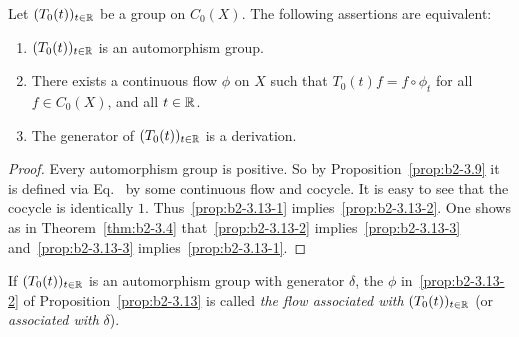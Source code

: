 \begin{proposition}\label{prop:b2-3.13}
Let $(T_{0}(t))_{t \in \mathbb{R}}$ be a group on $C_{0}(X)$.
The following assertions are equivalent:
\begin{enumerate}[\upshape (a)]
\item \label{prop:b2-3.13-1}
$(T_{0}(t))_{t \in \mathbb{R}}$ is an automorphism group.
\item \label{prop:b2-3.13-2}
There exists a continuous flow $\phi$ on $X$ such that $T_{0}(t)f = f \circ \phi_{t}$  for all \\
 $f \in C_{0}(X)$, and all $t \in \mathbb{R}$.
\item \label{prop:b2-3.13-3} 
The generator of\/ $(T_{0}(t))_{t \in \mathbb{R}}$ is a derivation.
\end{enumerate}
\end{proposition}
\begin{proof}
Every automorphism group is positive.
So by Proposition~\ref{prop:b2-3.9}  it is defined via Eq.~ by some continuous flow and cocycle.
It is easy to see that the cocycle is identically $1$.
Thus~\ref{prop:b2-3.13-1} implies~\ref{prop:b2-3.13-2}.
One shows as in Theorem~\ref{thm:b2-3.4}  that~\ref{prop:b2-3.13-2} implies~\ref{prop:b2-3.13-3} and~\ref{prop:b2-3.13-3} implies~\ref{prop:b2-3.13-1}.
\end{proof}
If\/ $(T_{0}(t))_{t \in \mathbb{R}}$ is an automorphism group with generator $\delta$, the $\phi$ in~\ref{prop:b2-3.13-2} of Proposition~\ref{prop:b2-3.13} is called \emph{the flow associated with} $(T_{0}(t))_{t \in \mathbb{R}}$ (or \emph{associated with} $\delta$).

